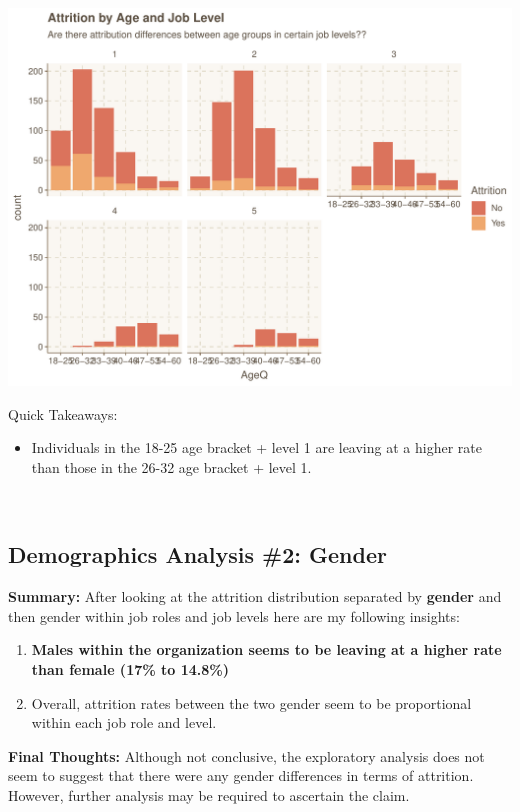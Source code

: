 \documentclass[
]{article}
\providecommand{\tightlist}{%
  \setlength{\itemsep}{0pt}\setlength{\parskip}{0pt}}
\begin{document}
\includegraphics{figures/Age and Job Level-1.pdf}

Quick Takeaways:

\begin{itemize}
\tightlist
\item
  Individuals in the 18-25 age bracket + level 1 are leaving at a higher
  rate than those in the 26-32 age bracket + level 1.
\end{itemize}

~ ~

\hypertarget{demographics-analysis-2-gender}{%
\subsection{Demographics Analysis \#2:
Gender}\label{demographics-analysis-2-gender}}

\textbf{Summary:} After looking at the attrition distribution separated
by \textbf{gender} and then gender within job roles and job levels here
are my following insights:

\begin{enumerate}
\def\labelenumi{\arabic{enumi}.}
\item
  \textbf{Males within the organization seems to be leaving at a higher
  rate than female (17\% to 14.8\%)}
\item
  Overall, attrition rates between the two gender seem to be
  proportional within each job role and level.
\end{enumerate}

\textbf{Final Thoughts:} Although not conclusive, the exploratory
analysis does not seem to suggest that there were any gender differences
in terms of attrition. However, further analysis may be required to
ascertain the claim.
\end{document}
